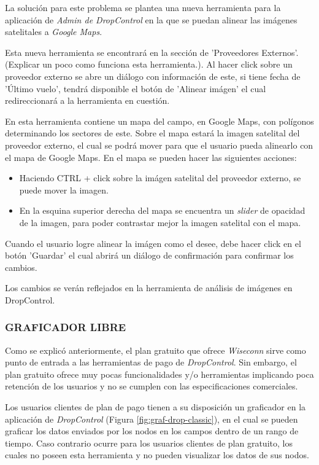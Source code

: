 La solución para este problema se plantea una nueva herramienta para la aplicación de \textit{Admin de DropControl} en la que
se puedan alinear las imágenes satelitales a \textit{Google Maps}.

Esta nueva herramienta se encontrará en la sección de 'Proveedores Externos'. (Explicar un poco como funciona esta herramienta.). Al hacer click sobre un proveedor externo se abre un diálogo con información de este, si tiene fecha de 'Último vuelo', tendrá disponible el botón de 'Alinear imágen' el cual redireccionará a la herramienta en cuestión.

En esta herramienta contiene un mapa del campo, en Google Maps, con polígonos determinando los sectores de este. Sobre el mapa estará la imagen satelital del proveedor externo, el cual se podrá mover para que el usuario pueda alinearlo con el mapa de Google Maps.
En el mapa se pueden hacer las siguientes acciones:
\begin{itemize}
    \item Haciendo CTRL + click sobre la imágen satelital del proveedor externo, se puede mover la imagen.
    \item En la esquina superior derecha del mapa se encuentra un \textit{slider} de opacidad de la imagen, para poder contrastar mejor la imagen satelital con el mapa.
\end{itemize}

Cuando el usuario logre alinear la imágen como el desee, debe hacer click en el botón 'Guardar' el cual abrirá un diálogo de confirmación para confirmar los cambios.

Los cambios se verán reflejados en la herramienta de análisis de imágenes en DropControl.
\fi
\subsubsection{GRAFICADOR LIBRE}

Como se explicó anteriormente, el plan gratuito que ofrece \textit{Wiseconn} sirve como punto de entrada a las herramientas
de pago de \textit{DropControl}. Sin embargo, el plan gratuito ofrece muy pocas funcionalidades y/o herramientas
implicando poca retención de los usuarios y no se cumplen con las especificaciones comerciales.

Los usuarios clientes de plan de pago tienen a su disposición un graficador en la aplicación de \textit{DropControl} (Figura \ref{fig:graf-drop-classic}), en el cual
se pueden graficar los datos enviados por los nodos en los campos dentro de un rango de tiempo.
Caso contrario ocurre para los usuarios clientes de plan gratuito, los cuales no poseen esta herramienta y
no pueden visualizar los datos de sus nodos.

